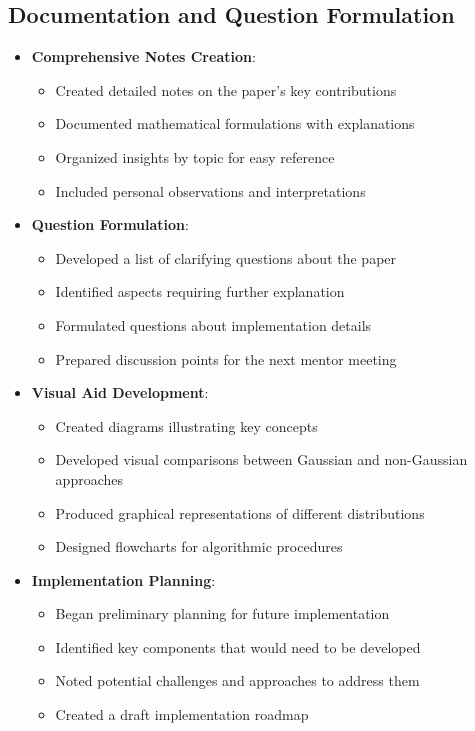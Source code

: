 \documentclass{article}
\begin{document}
\subsection{Documentation and Question Formulation}

\begin{itemize}
  \item \textbf{Comprehensive Notes Creation}:
  \begin{itemize}
    \item Created detailed notes on the paper's key contributions
    \item Documented mathematical formulations with explanations
    \item Organized insights by topic for easy reference
    \item Included personal observations and interpretations
  \end{itemize}

  \item \textbf{Question Formulation}:
  \begin{itemize}
    \item Developed a list of clarifying questions about the paper
    \item Identified aspects requiring further explanation
    \item Formulated questions about implementation details
    \item Prepared discussion points for the next mentor meeting
  \end{itemize}

  \item \textbf{Visual Aid Development}:
  \begin{itemize}
    \item Created diagrams illustrating key concepts
    \item Developed visual comparisons between Gaussian and non-Gaussian approaches
    \item Produced graphical representations of different distributions
    \item Designed flowcharts for algorithmic procedures
  \end{itemize}

  \item \textbf{Implementation Planning}:
  \begin{itemize}
    \item Began preliminary planning for future implementation
    \item Identified key components that would need to be developed
    \item Noted potential challenges and approaches to address them
    \item Created a draft implementation roadmap
  \end{itemize}
\end{itemize}
\end{document}
